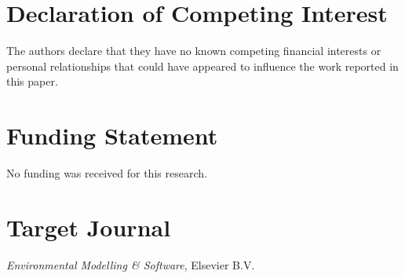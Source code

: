 \documentclass[11pt,a4paper]{article}
\begin{document}
\section*{Declaration of Competing Interest}
The authors declare that they have no known competing financial interests or personal relationships that could have appeared to influence the work reported in this paper.

\vspace{1.5em}

\section*{Funding Statement}
No funding was received for this research.

\vspace{1.5em}

\section*{Target Journal}
\textit{Environmental Modelling \& Software}, Elsevier B.V.
\end{document}
